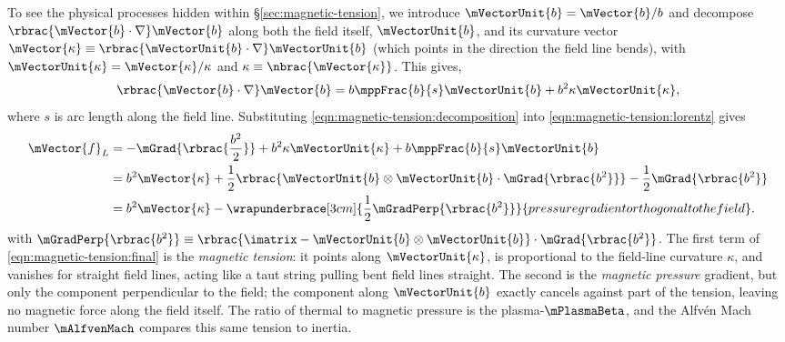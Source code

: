 \documentclass{article}
\begin{document}
To see the physical processes hidden within \S\ref{sec:magnetic-tension}, we introduce $\mVectorUnit{b} = \mVector{b} / b$ and decompose $\rbrac{\mVector{b}\cdot\nabla}\mVector{b}$ along both the field itself, $\mVectorUnit{b}$, and its curvature vector $\mVector{\kappa} \equiv \rbrac{\mVectorUnit{b}\cdot\nabla}\mVectorUnit{b}$ (which points in the direction the field line bends), with $\mVectorUnit{\kappa} = \mVector{\kappa} / \kappa$ and $\kappa \equiv \nbrac{\mVector{\kappa}}$. This gives,
\begin{align}
    \rbrac{\mVector{b}\cdot\nabla}\mVector{b}
    = b \mppFrac{b}{s} \mVectorUnit{b}
        + b^2\kappa \mVectorUnit{\kappa}
    , \label{eqn:magnetic-tension:decomposition}
\end{align}
where $s$ is arc length along the field line. Substituting \cref{eqn:magnetic-tension:decomposition} into \cref{eqn:magnetic-tension:lorentz} gives
\begin{align}
    \mVector{f}_L
    &= -\mGrad{\rbrac{\frac{b^2}{2}}}
        + b^2\kappa \mVectorUnit{\kappa}
        + b \mppFrac{b}{s} \mVectorUnit{b}
    \nonumber \\
    &= b^2 \mVector{\kappa}
        + \frac{1}{2} \rbrac{\mVectorUnit{b}\otimes\mVectorUnit{b}\cdot\mGrad{\rbrac{b^2}}}
        - \frac{1}{2} \mGrad{\rbrac{b^2}}
    \nonumber \\
    &= b^2 \mVector{\kappa}
        - \wrapunderbrace[3cm]{\frac{1}{2} \mGradPerp{\rbrac{b^2}}}{pressure gradient orthogonal to the field}
    . \label{eqn:magnetic-tension:final}
\end{align}
with $\mGradPerp{\rbrac{b^2}} \equiv \rbrac{\imatrix - \mVectorUnit{b}\otimes\mVectorUnit{b}}\cdot\mGrad{\rbrac{b^2}}$. The first term of \cref{eqn:magnetic-tension:final} is the \emph{magnetic tension}: it points along $\mVectorUnit{\kappa}$, is proportional to the field-line curvature $\kappa$, and vanishes for straight field lines, acting like a taut string pulling bent field lines straight. The second is the \emph{magnetic pressure} gradient, but only the component perpendicular to the field; the component along $\mVectorUnit{b}$ exactly cancels against part of the tension, leaving no magnetic force along the field itself. The ratio of thermal to magnetic pressure is the plasma-$\mPlasmaBeta$, and the Alfv\'en Mach number $\mAlfvenMach$ compares this same tension to inertia.

\end{document}
